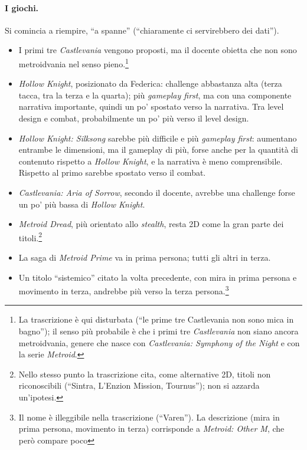 \paragraph{I giochi.} Si comincia a riempire, ``a spanne'' (``chiaramente ci
servirebbero dei dati'').
\begin{itemize}
  \item I primi tre \emph{Castlevania} vengono proposti, ma il docente
        obietta che non sono metroidvania nel senso pieno.\footnote{La
        trascrizione è qui disturbata (``le prime tre Castlevania non sono
        mica in bagno''); il senso più probabile è che i primi tre
        \emph{Castlevania} non siano ancora metroidvania, genere che nasce
        con \emph{Castlevania: Symphony of the Night} e con la serie
        \emph{Metroid}.}
  \item \emph{Hollow Knight}, posizionato da Federica: challenge abbastanza
        alta (terza tacca, tra la terza e la quarta); più \emph{gameplay
        first}, ma con una componente narrativa importante, quindi un po'
        spostato verso la narrativa. Tra level design e combat, probabilmente
        un po' più verso il level design.
  \item \emph{Hollow Knight: Silksong} sarebbe più difficile e più
        \emph{gameplay first}: aumentano entrambe le dimensioni, ma il
        gameplay di più, forse anche per la quantità di contenuto rispetto a
        \emph{Hollow Knight}, e la narrativa è meno comprensibile. Rispetto
        al primo sarebbe spostato verso il combat.
  \item \emph{Castlevania: Aria of Sorrow}, secondo il docente, avrebbe una
        challenge forse un po' più bassa di \emph{Hollow Knight}.
  \item \emph{Metroid Dread}, più orientato allo \emph{stealth}, resta 2D
        come la gran parte dei titoli.\footnote{Nello stesso punto la
        trascrizione cita, come alternative 2D, titoli non riconoscibili
        (``Sintra, L'Enzion Mission, Tournus''); non si azzarda un'ipotesi.}
  \item La saga di \emph{Metroid Prime} va in prima persona; tutti gli altri
        in terza.
  \item Un titolo ``sistemico'' citato la volta precedente, con mira in
        prima persona e movimento in terza, andrebbe più verso la terza
        persona.\footnote{Il nome è illeggibile nella trascrizione
        (``Varen''). La descrizione (mira in prima persona, movimento in
        terza) corrisponde a \emph{Metroid: Other M}, che però compare poco
}
\end{itemize}
